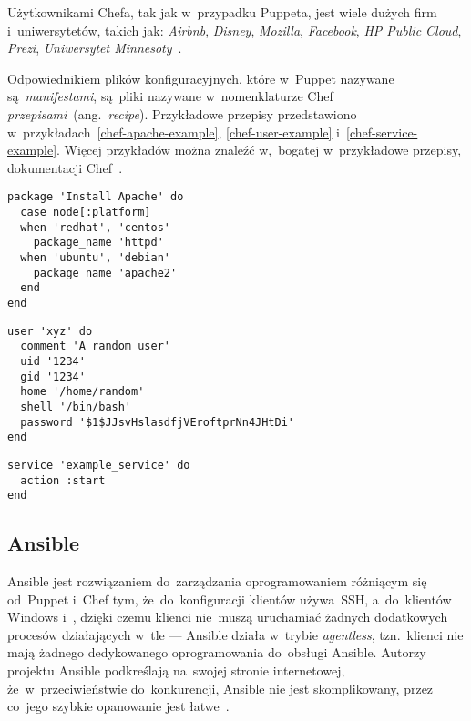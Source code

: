 \documentclass[thesis]{subfiles}
\begin{document}
Użytkownikami Chefa, tak jak w~przypadku Puppeta, jest wiele dużych firm i~uniwersytetów, takich jak: \emph{Airbnb}, \emph{Disney}, \emph{Mozilla}, \emph{Facebook}, \emph{HP Public Cloud}, \emph{Prezi}, \emph{Uniwersytet Minnesoty}~\cite{chef-customers,puppet-chef-disney}.

Odpowiednikiem plików konfiguracyjnych, które w~Puppet nazywane są~\emph{manifestami}, są~pliki nazywane w~nomenklaturze Chef \emph{przepisami}~(ang.~\emph{recipe}). Przykładowe przepisy przedstawiono w~przykładach~\ref{chef-apache-example}, \ref{chef-user-example} i~\ref{chef-service-example}. Więcej przykładów można znaleźć w,~bogatej w~przykładowe przepisy, dokumentacji Chef~\cite{chef-examples}.

\begin{lstlisting}[numbers=none,caption={Przepis Chef gwarantujący, że~serwer Apache zostanie zainstalowany niezależnie od~tego jak~się~nazywa paczka oprogramowania go~dostarczająca},label=chef-apache-example]
package 'Install Apache' do
  case node[:platform]
  when 'redhat', 'centos'
    package_name 'httpd'
  when 'ubuntu', 'debian'
    package_name 'apache2'
  end
end
\end{lstlisting}

\begin{lstlisting}[numbers=none,caption={Przepis Chef gwarantujący, że~użytkownik \texttt{xyz} istnieje w~systemie i~ma zadane ustawienia konta},label=chef-user-example]
user 'xyz' do
  comment 'A random user'
  uid '1234'
  gid '1234'
  home '/home/random'
  shell '/bin/bash'
  password '$1$JJsvHslasdfjVEroftprNn4JHtDi'
end
\end{lstlisting}

\begin{lstlisting}[numbers=none,caption={Przepis Chef gwarantujący, że~serwis \texttt{example\_service} jest uruchomiony},label=chef-service-example]
service 'example_service' do
  action :start
end
\end{lstlisting}


\subsection{Ansible}

Ansible jest rozwiązaniem do~zarządzania oprogramowaniem różniącym się od~Puppet i~Chef tym, że~do~konfiguracji klientów  używa~SSH, a~do~klientów Windows  i~, dzięki czemu klienci nie~muszą uruchamiać żadnych dodatkowych procesów działających w~tle --- Ansible działa w~trybie \emph{agentless}, tzn.~klienci nie mają żadnego dedykowanego oprogramowania do~obsługi Ansible. Autorzy projektu Ansible podkreślają na~swojej stronie internetowej, że~w~przeciwieństwie do~konkurencji, Ansible nie jest skomplikowany, przez co~jego szybkie opanowanie jest łatwe~\cite{ansible}.
\end{document}
